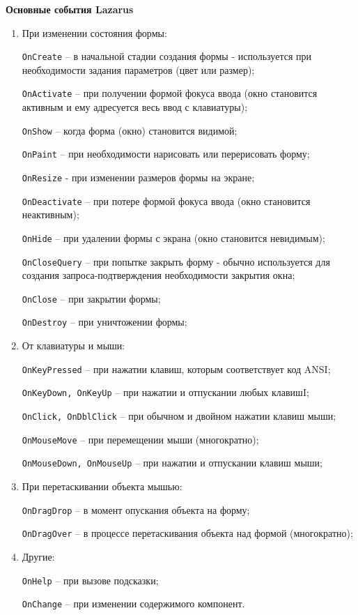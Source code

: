 \noindent
{\bf{Основные события Lazarus}}
\begin{enumerate}
\item При изменении состояния формы:

\texttt{OnCreate} – в начальной стадии создания формы - используется при необходимости задания параметров (цвет или размер);

\texttt{OnActivate} – при получении формой фокуса ввода (окно становится активным и ему адресуется весь ввод с клавиатуры);

\texttt{OnShow} – когда форма (окно) становится видимой;

\texttt{OnPaint} – при необходимости нарисовать или перерисовать форму;

\texttt{OnResize} - при изменении размеров формы на экране;

\texttt{OnDeactivate} – при потере формой фокуса ввода (окно становится неактивным);

\texttt{OnHide} – при удалении формы с экрана (окно становится невидимым); 

\texttt{OnCloseQuery} – при попытке закрыть форму - обычно используется для создания 
запроса-подтверждения необходимости закрытия окна;

\texttt{OnClose} – при закрытии формы;

\texttt{OnDestroy} – при уничтожении формы;
\item От клавиатуры и мыши:

\texttt{OnKeyPressed} – при нажатии клавиш, которым соответствует код ANSI;

\texttt{OnKeyDown, OnKeyUp} – при нажатии и отпускании любых клавишI;

\texttt{OnClick, OnDblClick} – при обычном и двойном нажатии клавиш мыши;

\texttt{OnMouseMove} – при перемещении мыши (многократно);

\texttt{OnMouseDown, OnMouseUp} – при нажатии и отпускании клавиш мыши;
\item При перетаскивании объекта мышью:

\texttt{OnDragDrop} – в момент опускания объекта на форму;

\texttt{OnDragOver} – в процессе перетаскивания объекта над формой (многократно);
\item Другие:

\texttt{OnHelp} – при вызове подсказки;

\texttt{OnChange} – при изменении содержимого компонент.
\end{enumerate}


